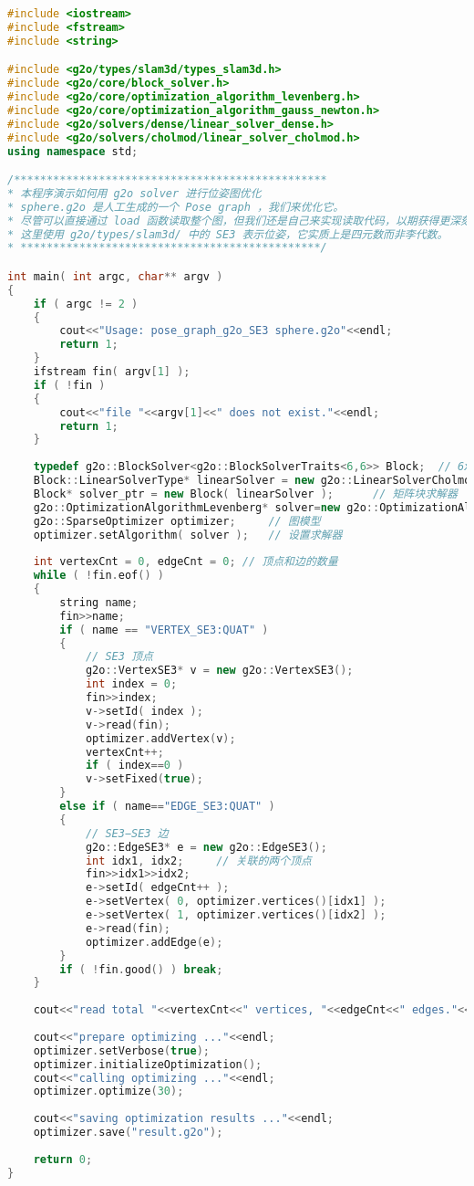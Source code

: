 \begin{lstlisting}[language=c++,caption=slambook/ch11/pose\_graph\_g2o\_SE3.cpp]
#include <iostream>
#include <fstream>
#include <string>

#include <g2o/types/slam3d/types_slam3d.h>
#include <g2o/core/block_solver.h>
#include <g2o/core/optimization_algorithm_levenberg.h>
#include <g2o/core/optimization_algorithm_gauss_newton.h>
#include <g2o/solvers/dense/linear_solver_dense.h>
#include <g2o/solvers/cholmod/linear_solver_cholmod.h>
using namespace std;

/************************************************
* 本程序演示如何用 g2o solver 进行位姿图优化
* sphere.g2o 是人工生成的一个 Pose graph ，我们来优化它。
* 尽管可以直接通过 load 函数读取整个图，但我们还是自己来实现读取代码，以期获得更深刻的理解。
* 这里使用 g2o/types/slam3d/ 中的 SE3 表示位姿，它实质上是四元数而非李代数。
* **********************************************/

int main( int argc, char** argv )
{
	if ( argc != 2 )
	{
		cout<<"Usage: pose_graph_g2o_SE3 sphere.g2o"<<endl;
		return 1;
	}
	ifstream fin( argv[1] );
	if ( !fin )
	{
		cout<<"file "<<argv[1]<<" does not exist."<<endl;
		return 1;
	}
	
	typedef g2o::BlockSolver<g2o::BlockSolverTraits<6,6>> Block;  // 6x6 BlockSolver
	Block::LinearSolverType* linearSolver = new g2o::LinearSolverCholmod<Block::PoseMatrixType>();
	Block* solver_ptr = new Block( linearSolver );      // 矩阵块求解器
	g2o::OptimizationAlgorithmLevenberg* solver=new g2o::OptimizationAlgorithmLevenberg(solver_ptr);
	g2o::SparseOptimizer optimizer;     // 图模型
	optimizer.setAlgorithm( solver );   // 设置求解器
	
	int vertexCnt = 0, edgeCnt = 0; // 顶点和边的数量
	while ( !fin.eof() )
	{
		string name;
		fin>>name;
		if ( name == "VERTEX_SE3:QUAT" )
		{
			// SE3 顶点
			g2o::VertexSE3* v = new g2o::VertexSE3();
			int index = 0;
			fin>>index;
			v->setId( index );
			v->read(fin);
			optimizer.addVertex(v);
			vertexCnt++;
			if ( index==0 )
			v->setFixed(true);
		}
		else if ( name=="EDGE_SE3:QUAT" )
		{
			// SE3−SE3 边
			g2o::EdgeSE3* e = new g2o::EdgeSE3();
			int idx1, idx2;     // 关联的两个顶点
			fin>>idx1>>idx2;
			e->setId( edgeCnt++ );
			e->setVertex( 0, optimizer.vertices()[idx1] );
			e->setVertex( 1, optimizer.vertices()[idx2] );
			e->read(fin);
			optimizer.addEdge(e);
		}
		if ( !fin.good() ) break;
	}
	
	cout<<"read total "<<vertexCnt<<" vertices, "<<edgeCnt<<" edges."<<endl;
	
	cout<<"prepare optimizing ..."<<endl;
	optimizer.setVerbose(true);
	optimizer.initializeOptimization();
	cout<<"calling optimizing ..."<<endl;
	optimizer.optimize(30);
	
	cout<<"saving optimization results ..."<<endl;
	optimizer.save("result.g2o");
	
	return 0;
}
\end{lstlisting}

